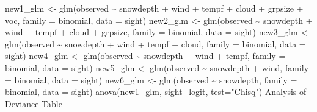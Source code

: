 \documentclass[
]{article}
\newenvironment{Shaded}{\begin{snugshade}}{\end{snugshade}}
\newcommand{\AttributeTok}[1]{\textcolor[rgb]{0.77,0.63,0.00}{#1}}
\newcommand{\FunctionTok}[1]{\textcolor[rgb]{0.00,0.00,0.00}{#1}}
\newcommand{\NormalTok}[1]{#1}
\newcommand{\OtherTok}[1]{\textcolor[rgb]{0.56,0.35,0.01}{#1}}
\newcommand{\SpecialCharTok}[1]{\textcolor[rgb]{0.00,0.00,0.00}{#1}}
\newcommand{\StringTok}[1]{\textcolor[rgb]{0.31,0.60,0.02}{#1}}
\begin{document}
\begin{Shaded}
\begin{Highlighting}[]
\NormalTok{new1\_glm }\OtherTok{\textless{}{-}} \FunctionTok{glm}\NormalTok{(observed }\SpecialCharTok{\textasciitilde{}}\NormalTok{ snowdepth }\SpecialCharTok{+}\NormalTok{ wind }\SpecialCharTok{+}\NormalTok{ tempf }\SpecialCharTok{+}\NormalTok{ cloud }\SpecialCharTok{+}\NormalTok{ grpsize }\SpecialCharTok{+}\NormalTok{ voc, }\AttributeTok{family =}\NormalTok{ binomial, }\AttributeTok{data =}\NormalTok{ sight)}
\NormalTok{new2\_glm }\OtherTok{\textless{}{-}} \FunctionTok{glm}\NormalTok{(observed }\SpecialCharTok{\textasciitilde{}}\NormalTok{ snowdepth }\SpecialCharTok{+}\NormalTok{ wind }\SpecialCharTok{+}\NormalTok{ tempf }\SpecialCharTok{+}\NormalTok{ cloud }\SpecialCharTok{+}\NormalTok{ grpsize, }\AttributeTok{family =}\NormalTok{ binomial, }\AttributeTok{data =}\NormalTok{ sight)}
\NormalTok{new3\_glm }\OtherTok{\textless{}{-}} \FunctionTok{glm}\NormalTok{(observed }\SpecialCharTok{\textasciitilde{}}\NormalTok{ snowdepth }\SpecialCharTok{+}\NormalTok{ wind }\SpecialCharTok{+}\NormalTok{ tempf }\SpecialCharTok{+}\NormalTok{ cloud, }\AttributeTok{family =}\NormalTok{ binomial, }\AttributeTok{data =}\NormalTok{ sight)}
\NormalTok{new4\_glm }\OtherTok{\textless{}{-}} \FunctionTok{glm}\NormalTok{(observed }\SpecialCharTok{\textasciitilde{}}\NormalTok{ snowdepth }\SpecialCharTok{+}\NormalTok{ wind }\SpecialCharTok{+}\NormalTok{ tempf, }\AttributeTok{family =}\NormalTok{ binomial, }\AttributeTok{data =}\NormalTok{ sight)}
\NormalTok{new5\_glm }\OtherTok{\textless{}{-}} \FunctionTok{glm}\NormalTok{(observed }\SpecialCharTok{\textasciitilde{}}\NormalTok{ snowdepth }\SpecialCharTok{+}\NormalTok{ wind, }\AttributeTok{family =}\NormalTok{ binomial, }\AttributeTok{data =}\NormalTok{ sight)}
\NormalTok{new6\_glm }\OtherTok{\textless{}{-}} \FunctionTok{glm}\NormalTok{(observed }\SpecialCharTok{\textasciitilde{}}\NormalTok{ snowdepth, }\AttributeTok{family =}\NormalTok{ binomial, }\AttributeTok{data =}\NormalTok{ sight)}
\FunctionTok{anova}\NormalTok{(new1\_glm, sight\_logit, }\AttributeTok{test=}\StringTok{"Chisq"}\NormalTok{)}
\NormalTok{Analysis of Deviance Table}


\end{Highlighting}
\end{Shaded}
\end{document}
